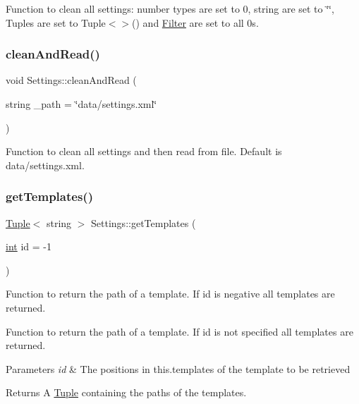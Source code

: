 Function to clean all settings\+: number types are set to 0, string are set to \char`\"{}\char`\"{}, Tuples are set to Tuple$<$$>$() and \mbox{\hyperlink{class_filter}{Filter}} are set to all 0s. 

\mbox{\label{class_settings_a2157ac946bff77fef41a2fba737ae4c2}} 
\subsubsection{\texorpdfstring{cleanAndRead()}{cleanAndRead()}}
{\footnotesize\ttfamily void Settings\+::clean\+And\+Read (\begin{DoxyParamCaption}\item[{string}]{\+\_\+path = {\ttfamily \char`\"{}data/settings.xml\char`\"{}} }\end{DoxyParamCaption})}



Function to clean all settings and then read from file. Default is data/settings.\+xml. 

\mbox{\label{class_settings_af68cb84ba3c8d21e004661fee7c0efe7}} 
\subsubsection{\texorpdfstring{getTemplates()}{getTemplates()}\hspace{0.1cm}{\footnotesize\ttfamily [1/3]}}
{\footnotesize\ttfamily \mbox{\hyperlink{class_tuple}{Tuple}}$<$ string $>$ Settings\+::get\+Templates (\begin{DoxyParamCaption}\item[{\mbox{\hyperlink{draw_8hh_aa620a13339ac3a1177c86edc549fda9b}{int}}}]{id = {\ttfamily -\/1} }\end{DoxyParamCaption})}



Function to return the path of a template. If id is negative all templates are returned. 

Function to return the path of a template. If id is not specified all templates are returned.


\begin{DoxyParams}{Parameters}
{\em id} & The positions in this.\+templates of the template to be retrieved \\
\hline
\end{DoxyParams}
\begin{DoxyReturn}{Returns}
A \mbox{\hyperlink{class_tuple}{Tuple}} containing the paths of the templates. 
\end{DoxyReturn}
\mbox{\label{class_settings_aa77f9d559fb0f14d551c4ee8a742e6b0}} 
